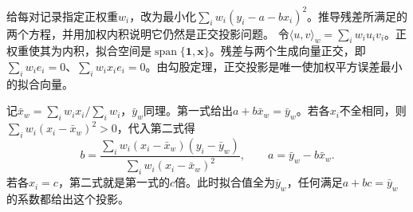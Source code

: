 给每对记录指定正权重\(w_i\)，改为最小化\(\sum_iw_i(y_i-a-bx_i)^2\)。推导残差所满足的两个方程，并用加权内积说明它仍然是正交投影问题。
\solutionanswer
令\(\langle u,v\rangle_w=\sum_iw_iu_iv_i\)。正权重使其为内积，拟合空间是\(\operatorname{span}\{\boldsymbol1,\boldsymbol x\}\)。残差与两个生成向量正交，即\(\sum_iw_ie_i=0\)、\(\sum_iw_ix_ie_i=0\)。由勾股定理，正交投影是唯一使加权平方误差最小的拟合向量。

记\(\bar x_w=\sum_i w_ix_i/\sum_i w_i\)，\(\bar y_w\)同理。第一式给出\(a+b\bar x_w=\bar y_w\)。若各\(x_i\)不全相同，则\(\sum_iw_i(x_i-\bar x_w)^2>0\)，代入第二式得
\[
 b=\frac{\sum_iw_i(x_i-\bar x_w)(y_i-\bar y_w)}{\sum_iw_i(x_i-\bar x_w)^2},\qquad a=\bar y_w-b\bar x_w.
\]
若各\(x_i=c\)，第二式就是第一式的\(c\)倍。此时拟合值全为\(\bar y_w\)，任何满足\(a+bc=\bar y_w\)的系数都给出这个投影。
\par
